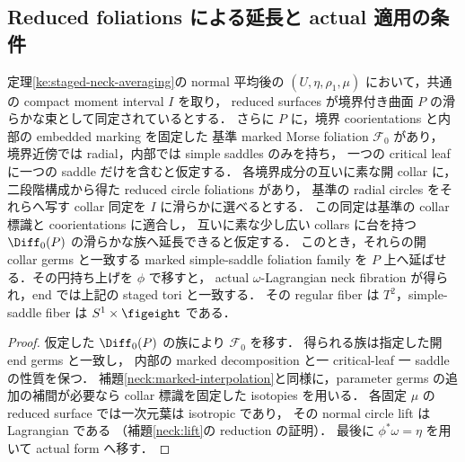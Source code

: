 \subsection{Reduced foliations による延長と actual 適用の条件}

\begin{corollary}
\label{ke:staged-reduced-extension}
定理\ref{ke:staged-neck-averaging}の normal 平均後の
$(U,\eta,\rho_1,\mu)$ において，共通の compact moment interval $I$ を取り，
reduced surfaces が境界付き曲面 $P$ の滑らかな束として同定されているとする．
さらに $P$ に，境界 coorientations と内部の embedded marking を固定した
基準 marked Morse foliation $\mathcal F_0$ があり，
境界近傍では radial，内部では simple saddles のみを持ち，
一つの critical leaf に一つの saddle だけを含むと仮定する．
各境界成分の互いに素な開 collar に，二段階構成から得た reduced circle foliations があり，
基準の radial circles をそれらへ写す collar 同定を $I$ に滑らかに選べるとする．
この同定は基準の collar 標識と coorientations に適合し，
互いに素な少し広い collars に台を持つ $\Diff_0(P)$ の滑らかな族へ延長できると仮定する．
このとき，それらの開 collar germs と一致する marked simple-saddle foliation family を
$P$ 上へ延ばせる．その円持ち上げを $\phi$ で移すと，
actual $\omega$-Lagrangian neck fibration が得られ，end では上記の staged tori と一致する．
その regular fiber は $T^2$，simple-saddle fiber は $S^1\times\figeight$ である．
\end{corollary}
\begin{proof}
仮定した $\Diff_0(P)$ の族により $\mathcal F_0$ を移す．
得られる族は指定した開 end germs と一致し，
内部の marked decomposition と一 critical-leaf 一 saddle の性質を保つ．
補題\ref{neck:marked-interpolation}と同様に，parameter germs の追加の補間が必要なら
collar 標識を固定した isotopies を用いる．
各固定 $\mu$ の reduced surface では一次元葉は isotropic であり，
その normal circle lift は Lagrangian である
（補題\ref{neck:lift}の reduction の証明）．
最後に $\phi^*\omega=\eta$ を用いて actual form へ移す．
\end{proof}

